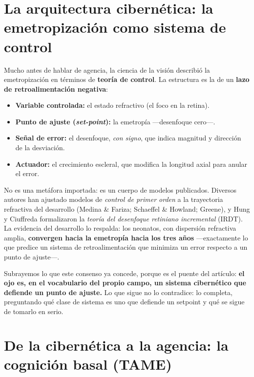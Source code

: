 \documentclass[11pt,a4paper]{article}
\begin{document}
\section{La arquitectura cibernética: la emetropización como sistema de control}

Mucho antes de hablar de agencia, la ciencia de la visión describió la emetropización en términos de \textbf{teoría de control}. La estructura es la de un \textbf{lazo de retroalimentación negativa}:

\begin{itemize}[leftmargin=1.4em]
  \item \textbf{Variable controlada:} el estado refractivo (el foco en la retina).
  \item \textbf{Punto de ajuste (\emph{set-point}):} la emetropía ---desenfoque cero---.
  \item \textbf{Señal de error:} el desenfoque, \emph{con signo}, que indica magnitud y dirección de la desviación.
  \item \textbf{Actuador:} el crecimiento escleral, que modifica la longitud axial para anular el error.
\end{itemize}

No es una metáfora importada: es un cuerpo de modelos publicados. Diversos autores han ajustado modelos de \emph{control de primer orden} a la trayectoria refractiva del desarrollo (Medina \& Fariza; Schaeffel \& Howland; Greene), y Hung y Ciuffreda formalizaron la \emph{teoría del desenfoque retiniano incremental} (IRDT). La evidencia del desarrollo lo respalda: los neonatos, con dispersión refractiva amplia, \textbf{convergen hacia la emetropía hacia los tres años} ---exactamente lo que predice un sistema de retroalimentación que minimiza un error respecto a un punto de ajuste---.

Subrayemos lo que este consenso ya concede, porque es el puente del artículo: \textbf{el ojo es, en el vocabulario del propio campo, un sistema cibernético que defiende un punto de ajuste.} Lo que sigue no lo contradice: lo completa, preguntando qué clase de sistema es uno que defiende un setpoint y qué se sigue de tomarlo en serio.

\section{De la cibernética a la agencia: la cognición basal (TAME)}
\end{document}
